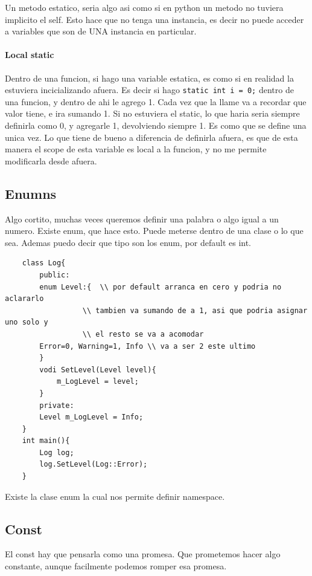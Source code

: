 \documentclass[11pt]{article}
\begin{document}
Un metodo estatico, seria algo asi como si en python un metodo no
tuviera implicito el self.
Esto hace que no tenga una instancia, es decir no puede acceder a variables que son
de UNA instancia en particular.

\paragraph{Local static}
Dentro de una funcion, si hago una variable estatica, es como si en realidad la
estuviera incicializando afuera.
Es decir si hago \texttt{static int i = 0;} dentro de una funcion, y dentro de ahi
le agrego 1.
Cada vez que la llame va a recordar que valor tiene, e ira sumando 1.
Si no estuviera el static, lo que haria seria siempre definirla como 0, y agregarle
1, devolviendo siempre 1.
Es como que se define una unica vez.
Lo que tiene de bueno a diferencia de definirla afuera, es que de esta manera
el scope de esta variable es local a la funcion, y no me permite modificarla
desde afuera.

\subsection{Enumns}
Algo cortito, muchas veces queremos definir una palabra o algo igual a un numero.
Existe enum, que hace esto.
Puede meterse dentro de una clase o lo que sea.
Ademas puedo decir que tipo son los enum, por default es int.
\begin{lstlisting}
    class Log{
        public:
        enum Level:{  \\ por default arranca en cero y podria no aclararlo
                  \\ tambien va sumando de a 1, asi que podria asignar uno solo y
                  \\ el resto se va a acomodar
        Error=0, Warning=1, Info \\ va a ser 2 este ultimo
        }
        vodi SetLevel(Level level){
            m_LogLevel = level;
        }
        private:
        Level m_LogLevel = Info;
    }
    int main(){
        Log log;
        log.SetLevel(Log::Error);
    }
\end{lstlisting}


Existe la clase enum la cual nos permite definir namespace.
\subsection{Const}
El const hay que pensarla como una promesa.
Que prometemos hacer algo constante, aunque facilmente podemos romper esa promesa.
\end{document}
